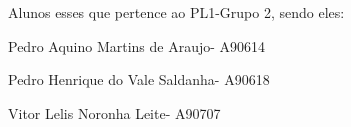 Alunos esses que pertence ao P\+L1-\/\+Grupo 2, sendo eles\+:

Pedro Aquino Martins de Araujo-\/ A90614

Pedro Henrique do Vale Saldanha-\/ A90618

Vitor Lelis Noronha Leite-\/ A90707 